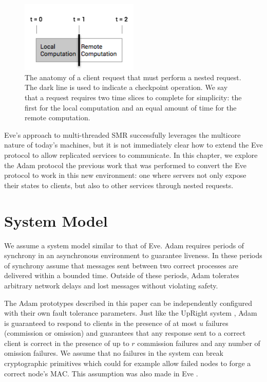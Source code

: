 \documentclass[11pt, oneside]{report}
\begin{document}
\begin{figure}[h]
\centering
\includegraphics[width=0.5\textwidth]{RequestAnatomy.png}
\caption{\label{anatomy}The anatomy of a client request that must perform a nested request. The dark line is used to indicate a checkpoint operation. We say that a request requires two time slices to complete for simplicity: the first for the local computation and an equal amount of time for the remote computation.}
\end{figure}

Eve's approach to multi-threaded SMR successfully leverages the multicore nature of today's machines, but it is not immediately clear how to extend the Eve protocol to allow replicated services to communicate. 
In this chapter, we explore the Adam protocol the previous work that was performed to convert the Eve protocol to work in this new environment: one where servers not only expose their states to clients, but also to other services through nested requests.

\section{System Model}
We assume a system model similar to that of Eve. 
Adam requires periods of synchrony in an asynchronous environment to guarantee liveness. 
In these periods of synchrony assume that messages sent between two correct processes are delivered within a bounded time. 
Outside of these periods, Adam tolerates arbitrary network delays and lost messages without violating safety.

The Adam prototypes described in this paper can be independently configured with their own fault tolerance parameters. 
Just like the UpRight system \cite{upRight}, Adam is guaranteed to respond to clients in the presence of at most $u$ failures (commission or omission) and guarantees that any response sent to a correct client is correct in the presence of up to $r$ commission failures and any number of omission failures. 
We assume that no failures in the system can break cryptographic primitives which could for example allow failed nodes to forge a correct node's MAC. This assumption was also made in Eve \cite{manosThesis, eve}.
\end{document}
